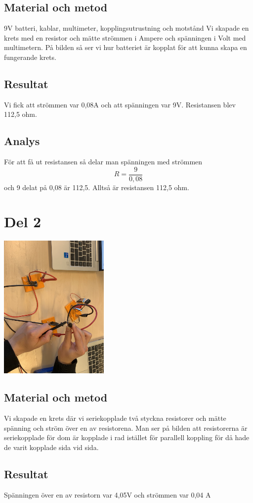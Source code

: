 \documentclass[11p]{article}
\begin{document}
    \subsection{Material och metod}
    9V batteri, kablar,  multimeter, kopplingsutrustning och motstånd
    Vi skapade en krets med en resistor och mätte strömmen i Ampere och spänningen i Volt med multimetern.
    På bilden så ser vi hur batteriet är kopplat för att kunna skapa en fungerande krets.
    \subsection{Resultat}
    Vi fick att strömmen var 0,08A och att spänningen var 9V. Resistansen blev 112,5 ohm.
    \subsection{Analys}
    För att få ut resistansen så delar man spänningen med strömmen
    \begin{equation} R = \frac{9}{0,08}\end{equation}
    och 9 delat på 0,08 är 112,5. Alltså är resistansen 112,5 ohm.
    \section{Del 2}
    \includegraphics[width=0.4\textwidth]{../images/Elbild2.jpg}
    \subsection{Material och metod}
Vi skapade en krets där vi seriekopplade två styckna resistorer och mätte spänning och ström över en av resistorena.
    Man ser på bilden att resistorerna är seriekopplade för dom är kopplade i rad istället för parallell koppling för då hade de varit kopplade sida vid sida.
    \subsection{Resultat}
    Spänningen över en av resistorn var 4,05V och strömmen var 0,04 A
\end{document}
